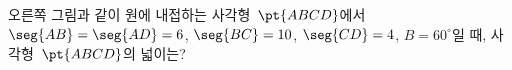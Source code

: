 \noindent\begin{minipage}[t]{0.58\linewidth}\vspace{0pt}\raggedright 오른쪽 그림과 같이 원에 내접하는 사각형~$\pt{ABCD}$에서 $\seg{AB}=\seg{AD}=6$, $\seg{BC}=10$, $\seg{CD}=4$, $B=60^\circ$일 때, 사각형~$\pt{ABCD}$의 넓이는?\end{minipage}\hfill\begin{minipage}[t]{0.4\linewidth}\vspace{0pt}\centering \resizebox{\ifdim\width>\linewidth\linewidth\else\width\fi}{!}{}\end{minipage}\par
{}
